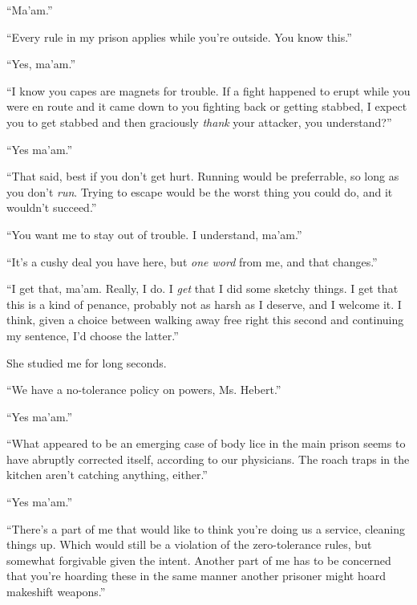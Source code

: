 ``Ma'am.''



``Every rule in my prison applies while you're outside.  You know this.''



``Yes, ma'am.''



``I know you capes are magnets for trouble.  If a fight happened to erupt while you were en route and it came down to you fighting back or getting stabbed, I expect you to get stabbed and then graciously \emph{thank} your attacker, you understand?''



``Yes ma'am.''



``That said, best if you don't get hurt.  Running would be preferrable, so long as you don't \emph{run}.  Trying to escape would be the worst thing you could do, and it wouldn't succeed.''



``You want me to stay out of trouble.  I understand, ma'am.''



``It's a cushy deal you have here, but \emph{one word} from me, and that changes.''



``I get that, ma'am.  Really, I do.  I \emph{get} that I did some sketchy things.  I get that this is a kind of penance, probably not as harsh as I deserve, and I welcome it.  I think, given a choice between walking away free right this second and continuing my sentence, I'd choose the latter.''



She studied me for long seconds.



``We have a no-tolerance policy on powers, Ms. Hebert.''



``Yes ma'am.''



``What appeared to be an emerging case of body lice in the main prison seems to have abruptly corrected itself, according to our physicians.  The roach traps in the kitchen aren't catching anything, either.''



``Yes ma'am.''



``There's a part of me that would like to think you're doing us a service, cleaning things up.  Which would still be a violation of the zero-tolerance rules, but somewhat forgivable given the intent.  Another part of me has to be concerned that you're hoarding these in the same manner another prisoner might hoard makeshift weapons.''



